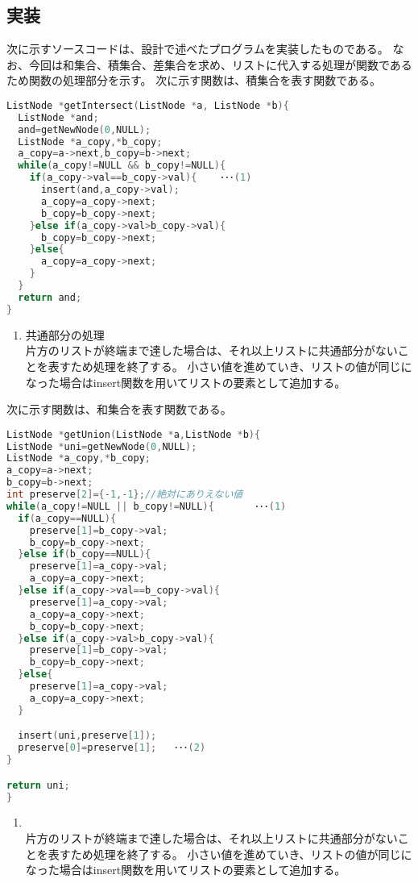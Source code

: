 \documentclass[a4j]{ltjsarticle}
\begin{document}
    \subsection{実装}
      次に示すソースコードは、設計で述べたプログラムを実装したものである。
      なお、今回は和集合、積集合、差集合を求め、リストに代入する処理が関数であるため関数の処理部分を示す。
      次に示す関数は、積集合を表す関数である。
      \begin{lstlisting}[language=C,caption=課題1-2(getIntersect関数)]
ListNode *getIntersect(ListNode *a, ListNode *b){
  ListNode *and;
  and=getNewNode(0,NULL);
  ListNode *a_copy,*b_copy;
  a_copy=a->next,b_copy=b->next;
  while(a_copy!=NULL && b_copy!=NULL){
    if(a_copy->val==b_copy->val){    ･･･(1)
      insert(and,a_copy->val);
      a_copy=a_copy->next;
      b_copy=b_copy->next;
    }else if(a_copy->val>b_copy->val){
      b_copy=b_copy->next;
    }else{
      a_copy=a_copy->next;
    }
  }
  return and;
}
        \end{lstlisting}
        \begin{enumerate}
          \item 共通部分の処理
          \\ \indent 片方のリストが終端まで達した場合は、それ以上リストに共通部分がないことを表すため処理を終了する。
          小さい値を進めていき、リストの値が同じになった場合はinsert関数を用いてリストの要素として追加する。
          
        \end{enumerate}

        次に示す関数は、和集合を表す関数である。

        \begin{lstlisting}[language=C,caption=課題1-2(get関数)]
ListNode *getUnion(ListNode *a,ListNode *b){
ListNode *uni=getNewNode(0,NULL);
ListNode *a_copy,*b_copy;
a_copy=a->next;
b_copy=b->next;
int preserve[2]={-1,-1};//絶対にありえない値
while(a_copy!=NULL || b_copy!=NULL){       ･･･(1)
  if(a_copy==NULL){
    preserve[1]=b_copy->val;
    b_copy=b_copy->next;
  }else if(b_copy==NULL){
    preserve[1]=a_copy->val;
    a_copy=a_copy->next;
  }else if(a_copy->val==b_copy->val){
    preserve[1]=a_copy->val;
    a_copy=a_copy->next;
    b_copy=b_copy->next;
  }else if(a_copy->val>b_copy->val){
    preserve[1]=b_copy->val;
    b_copy=b_copy->next;
  }else{
    preserve[1]=a_copy->val;
    a_copy=a_copy->next;
  }

  insert(uni,preserve[1]);
  preserve[0]=preserve[1];   ･･･(2)
}

return uni;
}
        \end{lstlisting}
        \begin{enumerate}
          \item 
          \\ \indent 片方のリストが終端まで達した場合は、それ以上リストに共通部分がないことを表すため処理を終了する。
          小さい値を進めていき、リストの値が同じになった場合はinsert関数を用いてリストの要素として追加する。
          
        \end{enumerate}
\end{document}

